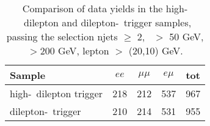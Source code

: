 \begin{table}[htb]
\begin{center}
\caption{\label{tab:yields4} Comparison of data yields in the high-\pt\ dilepton and dilepton-\Ht\ 
trigger samples, passing the selection njets $\geq$ 2, \met\ $>$ 50 GeV, \Ht$>$200 GeV,  lepton \pt $>$ (20,10) GeV.
}
\vspace{.25cm}
\begin{tabular}{l|cccc}
\hline
                    Sample   &           $ee$   &       $\mu\mu$   &         $e\mu$   &            tot  \\
\hline
high-\pt\ dilepton trigger   &            218   &            212   &            537   &            967  \\
dilepton-\Ht\ trigger        &            210   &            214   &            531   &            955  \\
\hline
\end{tabular}
\end{center}
\end{table}
